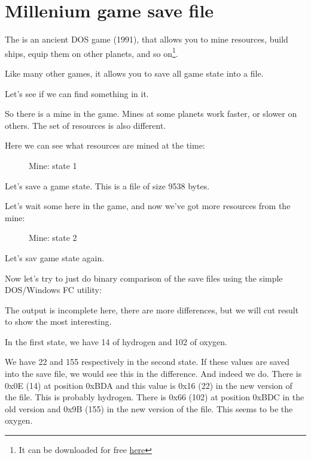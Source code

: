 ﻿\section{Millenium game save file}
\label{Millenium_DOS_game}

The  
is an ancient DOS game (1991), that allows you to mine resources, build ships,
equip them on other planets, and so on\footnote{It can be downloaded for free
\href{http://go.yurichev.com/17316}{here}}.

Like many other games, it allows you to save all game state into a file.

Let's see if we can find something in it.

\clearpage
So there is a mine in the game.
Mines at some planets 
work faster, or slower on others. 
The set of resources is also different.

Here we can see what resources are mined at the time: 

\begin{figure}[H]
\centering
{}
\caption{Mine: state 1}
\label{fig:mill_1}
\end{figure}

Let's save a game state.
This is a file of size 9538 bytes.

Let's wait some  here in the game, and now we've got more resources from the mine:

\begin{figure}[H]
\centering
{}
\caption{Mine: state 2}
\label{fig:mill_2}
\end{figure}

Let's sav game state again.

Now let's try to just do binary comparison of the save files using the simple DOS/Windows FC utility:



The output is incomplete here, there are more differences, but we will cut result to show the most interesting.

In the first state, we have 14  of hydrogen and 102  of oxygen.

We have 22 and 155  respectively in the second state.
If these values are saved into 
the save file, we would see this in the difference.
And indeed we do. 
There is 0x0E (14) at position 0xBDA and this value is 
0x16 (22) in the new version of the file.
This is probably hydrogen.
There is 0x66 (102) at position 0xBDC in the old 
version and 0x9B (155) in the new version of the file. 
This seems to be the oxygen.

